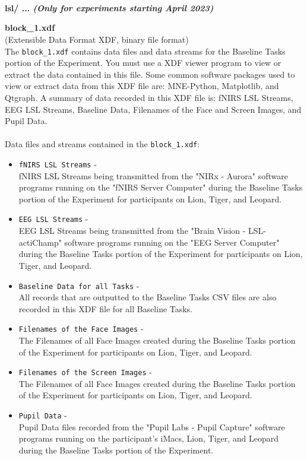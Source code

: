 \begin{description}
\textbf{\\\\\\}
\item\textbf{lsl/ ... \textit{(Only for experiments starting April 2023)}}
\begin{addmargin}[0em]{0em}
    \textbf{block\_1.xdf}\\(Extensible Data Format XDF, binary file format)\\
    The \verb|block_1.xdf| contains data files and data streams for the Baseline Tasks portion of the Experiment.
    You must use a XDF viewer program to view or extract the data contained in this file.
    Some common software packages used to view or extract data from this XDF file are: MNE-Python, Matplotlib, and Qtgraph.
    A summary of data recorded in this XDF file is: fNIRS LSL Streams, EEG LSL Streams, Baseline Data,
    Filenames of the Face and Screen Images, and Pupil Data.\\\\
    Data files and streams contained in the \verb|block_1.xdf|:
    \begin{itemize}
        \item \verb|fNIRS LSL Streams| -\\fNIRS LSL Streams being transmitted from the "NIRx - Aurora" software programs running on the "fNIRS Server Computer" during the Baseline Tasks portion of the Experiment for participants on Lion, Tiger, and Leopard.
        \item \verb|EEG LSL Streams| -\\EEG LSL Streams being transmitted from the "Brain Vision - LSL-actiChamp" software programs running on the "EEG Server Computer" during the Baseline Tasks portion of the Experiment for participants on Lion, Tiger, and Leopard.
        \item \verb|Baseline Data for all Tasks| -\\All records that are outputted to the Baseline Tasks CSV files are also recorded in this XDF file for all Baseline Tasks.
        \item \verb|Filenames of the Face Images| -\\The Filenames of all Face Images created during the Baseline Tasks portion of the Experiment for participants on Lion, Tiger, and Leopard.
        \item \verb|Filenames of the Screen Images| -\\The Filenames of all Face Images created during the Baseline Tasks portion of the Experiment for participants on Lion, Tiger, and Leopard.
        \item \verb|Pupil Data| -\\Pupil Data files recorded from the "Pupil Labs - Pupil Capture" software programs running on the participant's iMacs, Lion, Tiger, and Leopard during the Baseline Tasks portion of the Experiment.
    \end{itemize}



\end{addmargin}
\end{description}
